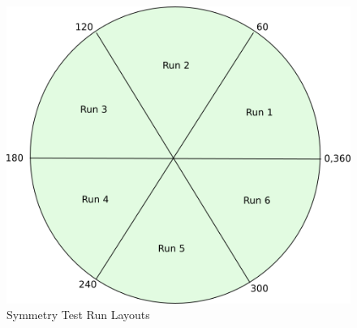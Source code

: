 \begin{figure}[h!]
\centering
\includegraphics{figures/run-layout.png}
\caption{Symmetry Test Run Layouts}
\label{fig:slicetest}
\end{figure}